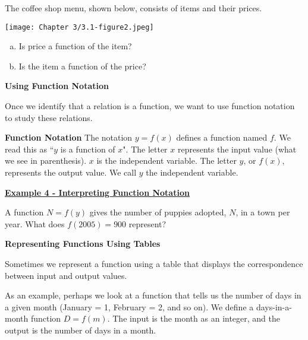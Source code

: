 \documentclass[12pt]{book}
\begin{document}
    The coffee shop menu, shown below, consists of items and their prices.
    \\
    
    \centerline{\texttt{[image: Chapter 3/3.1-figure2.jpeg]}}
    \begin{multicols}{2}
         \begin{enumerate}[(a)]
        \item Is price a function of the item?
        \vspace{50mm}
        \item Is the item a function of the price?
    \end{enumerate}
    \end{multicols}
   
    
\newpage
{\large \textbf{Using Function Notation}}
\vspace{3mm}

Once we identify that a relation is a function, we want to use function notation to study these relations.
\vspace{3mm}
\begin{boxR}
    \textbf{Function Notation}
    \vspace{1mm}
    \hline
    \vspace{2mm}
    The notation $y=f(x)$ defines a function named $f$. We read this as ``$y$ is a function of $x$". The letter $x$ represents the input value (what we see in parenthesis). $x$ is the independent variable. The letter $y$, or $f(x)$, represents the output value. We call $y$ the independent variable.
    \end{boxR}
\vspace{3mm}
 \underline{\textbf{Example 4 - Interpreting Function Notation}}
 
 A function $N = f(y)$ gives the number of puppies adopted, $N$, in a town per year. What does $f(2005)=900$ represent?


 
\newpage

{\large \textbf{Representing Functions Using Tables}}
\vspace{3mm}

Sometimes we represent a function using a table that displays the correspondence between input and output values. 

As an example, perhaps we look at a function that tells us the number of days in a given month (January = 1, February = 2, and so on). We define a days-in-a-month function $D = f(m)$. The input 
is the month as an integer, and the output is the number of days in a month. 
\vspace{5mm}
\end{document}
